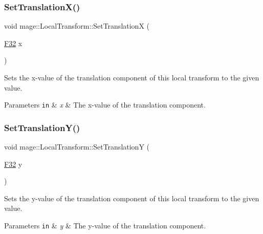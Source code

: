 \subsubsection{\texorpdfstring{Set\+Translation\+X()}{SetTranslationX()}}
{\footnotesize\ttfamily void mage\+::\+Local\+Transform\+::\+Set\+TranslationX (\begin{DoxyParamCaption}\item[{\hyperlink{namespacemage_aa97e833b45f06d60a0a9c4fc22ae02c0}{F32}}]{x }\end{DoxyParamCaption})\hspace{0.3cm}{\ttfamily [noexcept]}}

Sets the x-\/value of the translation component of this local transform to the given value.


\begin{DoxyParams}[1]{Parameters}
\mbox{\tt in}  & {\em x} & The x-\/value of the translation component. \\
\hline
\end{DoxyParams}
\hypertarget{classmage_1_1_local_transform_a7e06523876b41b3743e54e11516b61b8}{}\label{classmage_1_1_local_transform_a7e06523876b41b3743e54e11516b61b8} 
\subsubsection{\texorpdfstring{Set\+Translation\+Y()}{SetTranslationY()}}
{\footnotesize\ttfamily void mage\+::\+Local\+Transform\+::\+Set\+TranslationY (\begin{DoxyParamCaption}\item[{\hyperlink{namespacemage_aa97e833b45f06d60a0a9c4fc22ae02c0}{F32}}]{y }\end{DoxyParamCaption})\hspace{0.3cm}{\ttfamily [noexcept]}}

Sets the y-\/value of the translation component of this local transform to the given value.


\begin{DoxyParams}[1]{Parameters}
\mbox{\tt in}  & {\em y} & The y-\/value of the translation component. \\
\hline
\end{DoxyParams}
\hypertarget{classmage_1_1_local_transform_a11733e0dd9297c3742bc3c50056c71c3}{}\label{classmage_1_1_local_transform_a11733e0dd9297c3742bc3c50056c71c3} 
